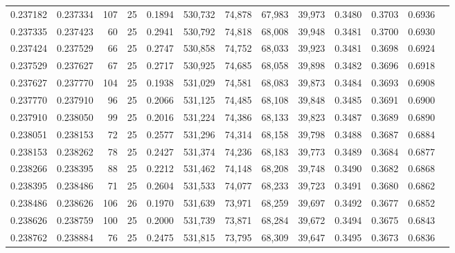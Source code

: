 \begin{tabular}{rrrrrrrrrrrrr}
0.237182 & 0.237334 &   107 &  25 &                                     0.1894 & 530,732 &  74,878 &  67,983 &  39,973 & 0.3480 & 0.3703 & 0.6936 \\
0.237335 & 0.237423 &    60 &  25 &                                     0.2941 & 530,792 &  74,818 &  68,008 &  39,948 & 0.3481 & 0.3700 & 0.6930 \\
0.237424 & 0.237529 &    66 &  25 &                                     0.2747 & 530,858 &  74,752 &  68,033 &  39,923 & 0.3481 & 0.3698 & 0.6924 \\
0.237529 & 0.237627 &    67 &  25 &                                     0.2717 & 530,925 &  74,685 &  68,058 &  39,898 & 0.3482 & 0.3696 & 0.6918 \\
0.237627 & 0.237770 &   104 &  25 &                                     0.1938 & 531,029 &  74,581 &  68,083 &  39,873 & 0.3484 & 0.3693 & 0.6908 \\
0.237770 & 0.237910 &    96 &  25 &                                     0.2066 & 531,125 &  74,485 &  68,108 &  39,848 & 0.3485 & 0.3691 & 0.6900 \\
0.237910 & 0.238050 &    99 &  25 &                                     0.2016 & 531,224 &  74,386 &  68,133 &  39,823 & 0.3487 & 0.3689 & 0.6890 \\
0.238051 & 0.238153 &    72 &  25 &                                     0.2577 & 531,296 &  74,314 &  68,158 &  39,798 & 0.3488 & 0.3687 & 0.6884 \\
0.238153 & 0.238262 &    78 &  25 &                                     0.2427 & 531,374 &  74,236 &  68,183 &  39,773 & 0.3489 & 0.3684 & 0.6877 \\
0.238266 & 0.238395 &    88 &  25 &                                     0.2212 & 531,462 &  74,148 &  68,208 &  39,748 & 0.3490 & 0.3682 & 0.6868 \\
0.238395 & 0.238486 &    71 &  25 &                                     0.2604 & 531,533 &  74,077 &  68,233 &  39,723 & 0.3491 & 0.3680 & 0.6862 \\
0.238486 & 0.238626 &   106 &  26 &                                     0.1970 & 531,639 &  73,971 &  68,259 &  39,697 & 0.3492 & 0.3677 & 0.6852 \\
0.238626 & 0.238759 &   100 &  25 &                                     0.2000 & 531,739 &  73,871 &  68,284 &  39,672 & 0.3494 & 0.3675 & 0.6843 \\
0.238762 & 0.238884 &    76 &  25 &                                     0.2475 & 531,815 &  73,795 &  68,309 &  39,647 & 0.3495 & 0.3673 & 0.6836 \\

\end{tabular}
